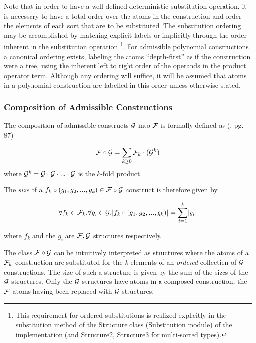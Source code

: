 Note that in order to have a well defined deterministic substitution operation,
it is necessary to have a total order over the atoms in the construction
and order the elements of each sort that are to be substituted.
The substitution ordering may be accomplished by matching explicit labels or
implicitly through the order inherent in the substitution operation%
\footnote{This requirement for ordered substitutions is realized explicitly in 
the substitution method of the Structure class (Substitution module) of the \GC implementation
(and Structure2, Structure3 for multi-sorted types).}.
For admissible polynomial constructions a canonical ordering exists,
labeling the atoms ``depth-first'' as if the construction were a tree,
using the inherent left to right order of the operands in the product operator term.
Although any ordering will suffice, it will be assumed that 
atoms in a polynomial construction are labelled in this order unless otherwise stated.

\subsubsection{ Composition of Admissible Constructions }

\begin{df}[Composition]
The composition of admissible constructs $\mathcal{G}$ into $\mathcal{F}$ is formally defined as (\cite{FlajoletSedgewick2009}, pg. 87)

$$\mathcal{F} \circ \mathcal{G} = \sum_{k \ge 0} \mathcal{F}_{k} \cdot ( \mathcal{G}^k ) $$
where $\mathcal{G}^k = \mathcal{G} \cdot \mathcal{G} \cdot ... \cdot \mathcal{G}$ is the $k$-fold product.
\end{df}

\noindent
The \emph{size} of a $f_k \circ (g_1, g_2, ..., g_k) \in \mathcal{F} \circ \mathcal{G}$ construct is therefore given by

$$\forall f_k \in \mathcal{F}_{k}.\forall g_i \in \mathcal{G}.\lvert f_k \circ (g_1, g_2, ..., g_k)\rvert = \sum_{i = 1}^{k} \lvert g_i\rvert$$

where $f_k$ and the $ g_i$ are $\mathcal{F}, \mathcal{G}$ structures respectively.


\noindent
The class $\mathcal{F} \circ \mathcal{G}$ can be intuitively interpreted as
structures where the atoms of a $\mathcal{F}_{k}$ construction are substituted for  
the $k$ elements of an \emph{ordered} collection of $\mathcal{G}$ constructions.
The size of such a structure is given by
the sum of the sizes of the $\mathcal{G}$ structures.
Only the $\mathcal{G}$ structures have atoms in a composed construction,
the $\mathcal{F}$ atoms having been replaced with $\mathcal{G}$ structures.

